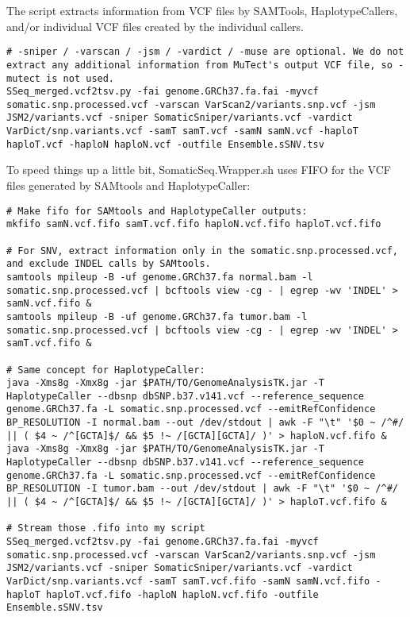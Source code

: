 \documentclass[10pt,letterpaper]{article}
\begin{document}
\begin{sloppypar}
The script extracts information from VCF files by SAMTools, HaplotypeCallers, and/or individual VCF files created by the individual callers. 
	
	
\begin{lstlisting}
# -sniper / -varscan / -jsm / -vardict / -muse are optional. We do not extract any additional information from MuTect's output VCF file, so -mutect is not used. 
SSeq_merged.vcf2tsv.py -fai genome.GRCh37.fa.fai -myvcf somatic.snp.processed.vcf -varscan VarScan2/variants.snp.vcf -jsm JSM2/variants.vcf -sniper SomaticSniper/variants.vcf -vardict VarDict/snp.variants.vcf -samT samT.vcf -samN samN.vcf -haploT haploT.vcf -haploN haploN.vcf -outfile Ensemble.sSNV.tsv
\end{lstlisting}
	
To speed things up a little bit, SomaticSeq.Wrapper.sh uses FIFO for the VCF files generated by SAMtools and HaplotypeCaller:
	
\begin{lstlisting}
# Make fifo for SAMtools and HaplotypeCaller outputs:
mkfifo samN.vcf.fifo samT.vcf.fifo haploN.vcf.fifo haploT.vcf.fifo

# For SNV, extract information only in the somatic.snp.processed.vcf, and exclude INDEL calls by SAMtools.
samtools mpileup -B -uf genome.GRCh37.fa normal.bam -l somatic.snp.processed.vcf | bcftools view -cg - | egrep -wv 'INDEL' > samN.vcf.fifo &
samtools mpileup -B -uf genome.GRCh37.fa tumor.bam -l somatic.snp.processed.vcf | bcftools view -cg - | egrep -wv 'INDEL' > samT.vcf.fifo &

# Same concept for HaplotypeCaller:
java -Xms8g -Xmx8g -jar $PATH/TO/GenomeAnalysisTK.jar -T HaplotypeCaller --dbsnp dbSNP.b37.v141.vcf --reference_sequence genome.GRCh37.fa -L somatic.snp.processed.vcf --emitRefConfidence BP_RESOLUTION -I normal.bam --out /dev/stdout | awk -F "\t" '$0 ~ /^#/ || ( $4 ~ /^[GCTA]$/ && $5 !~ /[GCTA][GCTA]/ )' > haploN.vcf.fifo &
java -Xms8g -Xmx8g -jar $PATH/TO/GenomeAnalysisTK.jar -T HaplotypeCaller --dbsnp dbSNP.b37.v141.vcf --reference_sequence genome.GRCh37.fa -L somatic.snp.processed.vcf --emitRefConfidence BP_RESOLUTION -I tumor.bam --out /dev/stdout | awk -F "\t" '$0 ~ /^#/ || ( $4 ~ /^[GCTA]$/ && $5 !~ /[GCTA][GCTA]/ )' > haploT.vcf.fifo &
		
# Stream those .fifo into my script		
SSeq_merged.vcf2tsv.py -fai genome.GRCh37.fa.fai -myvcf somatic.snp.processed.vcf -varscan VarScan2/variants.snp.vcf -jsm JSM2/variants.vcf -sniper SomaticSniper/variants.vcf -vardict VarDict/snp.variants.vcf -samT samT.vcf.fifo -samN samN.vcf.fifo -haploT haploT.vcf.fifo -haploN haploN.vcf.fifo -outfile Ensemble.sSNV.tsv
\end{lstlisting}



\end{sloppypar}
\end{document}
